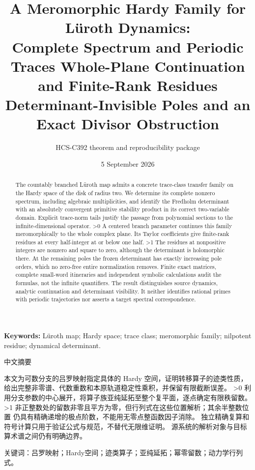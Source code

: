 \documentclass[10pt]{article}
\title{A Meromorphic Hardy Family for Lüroth Dynamics:\\
\ifcase\CRevisionRound Complete Spectrum and Periodic Traces
\or Whole-Plane Continuation and Finite-Rank Residues
\else Determinant-Invisible Poles and an Exact Divisor Obstruction\fi}
\author{HCS-C392 theorem and reproducibility package}
\date{5 September 2026}
\begin{document}
\maketitle
\begin{abstract}
The countably branched Lüroth map admits a concrete trace-class transfer
family on the Hardy space of the disk of radius two. We determine its
complete nonzero spectrum, including algebraic multiplicities, and identify
the Fredholm determinant with an absolutely convergent primitive stability
product in its correct two-variable domain. Explicit trace-norm tails justify
the passage from polynomial sections to the infinite-dimensional operator.
\ifnum\CRevisionRound>0
A centered branch parameter continues this family meromorphically to the
whole complex plane. Its Taylor coefficients give finite-rank residues at
every half-integer at or below one half.
\fi
\ifnum\CRevisionRound>1
The residues at nonpositive integers are nonzero and square to zero, although
the determinant is holomorphic there. At the remaining poles the frozen
determinant has exactly increasing pole orders, which no zero-free entire
normalization removes.
\fi
Finite exact matrices, complete small-word itineraries and independent
symbolic calculations audit the formulas, not the infinite quantifiers.
The result distinguishes source dynamics, analytic continuation and
determinant visibility. It neither identifies rational primes with
periodic trajectories nor asserts a target spectral correspondence.
\end{abstract}
\noindent\textbf{Keywords:} Lüroth map; Hardy space; trace class; meromorphic family; nilpotent residue; dynamical determinant.
\begin{otherlanguage}{chinese-simplified}
\begin{center}{\large 中文摘要}\end{center}
\begin{sloppypar}
本文为可数分支的吕罗映射指定具体的 \foreignlanguage{english}{Hardy} 空间，证明转移算子的迹类性质，
给出完整非零谱、代数重数和本原轨道稳定性乘积，并保留有限截断误差。
\ifnum\CRevisionRound>0
利用分支参数的中心展开，将算子族亚纯延拓至整个复平面，逐点确定有限秩留数。
\fi
\ifnum\CRevisionRound>1
非正整数处的留数非零且平方为零，但行列式在这些位置解析；其余半整数位置
仍具有精确递增的极点阶数，不能用无零点整函数因子消除。
\fi
独立精确复算和符号计算只用于验证公式与规范，不替代无限维证明。
源系统的解析对象与目标算术谱之间仍有明确边界。
\end{sloppypar}
\noindent 关键词：吕罗映射；\foreignlanguage{english}{Hardy}空间；迹类算子；亚纯延拓；幂零留数；动力学行列式。
\end{otherlanguage}
\end{document}
